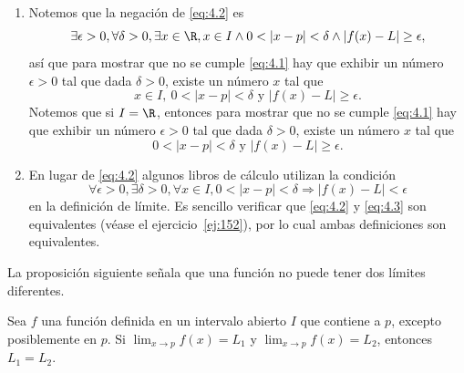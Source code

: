 \documentclass[12pt,a4paper]{book}
\begin{document}
\begin{observacion}
\begin{enumerate}[label=\arabic*.]
            \item Notemos que la negación de \eqref{eq:4.2} es
            \begin{equation*}
                \exists\epsilon>0,\forall\delta>0,\exists x\in\R,x\in I\wedge 0<|x-p|<\delta\wedge|f(x)-L|\geq\epsilon,
            \end{equation*}
            así que para mostrar que no se cumple \eqref{eq:4.1} hay que exhibir un número
            $\epsilon>0$ tal que dada $\delta>0$, existe un número $x$ tal que
            \begin{equation*}
                x\in I,\ 0<|x-p|<\delta\text{ y }|f(x)-L|\geq\epsilon.
            \end{equation*}
            Notemos que si $I=\R$, entonces para mostrar que no se cumple \eqref{eq:4.1} hay
            que exhibir un número $\epsilon>0$ tal que dada $\delta>0$, existe un número $x$ tal
            que
            \begin{equation*}
                0<|x-p|<\delta\text{ y }|f(x)-L|\geq\epsilon.
            \end{equation*}
            \item En lugar de \eqref{eq:4.2} algunos libros de cálculo utilizan la condición
            \begin{equation}\label{eq:4.3}
                \forall\epsilon>0,\exists\delta>0,\forall x\in I,0<|x-p|<\delta\Rightarrow|f(x)-L|<\epsilon
            \end{equation}
            en la definición de límite. Es sencillo verificar que \eqref{eq:4.2} y \eqref{eq:4.3} son
            equivalentes (véase el ejercicio~\ref{ej:152}), por lo cual ambas definiciones son
            equivalentes.
        \end{enumerate}
    \end{observacion}

    La proposición siguiente señala que una función no puede tener dos límites
    diferentes.

    \begin{proposicion}\label{prop:32}
        Sea $f$ una función definida en
        un intervalo abierto $I$ que contiene a $p$, excepto posiblemente en $p$. Si
        $\lim_{x\to p}f(x)=L_{1}$ y $\lim_{x\to p}f(x)=L_{2}$, entonces $L_{1}=L_{2}$.
    \end{proposicion}
\end{document}
